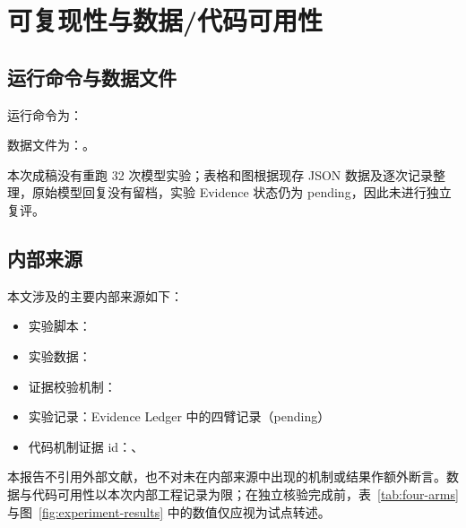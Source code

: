 \documentclass[UTF8]{ctexart}
\begin{document}
\section{可复现性与数据/代码可用性}

\subsection{运行命令与数据文件}

运行命令为：


数据文件为：。

本次成稿没有重跑 32 次模型实验；表格和图根据现存 JSON 数据及逐次记录整理，原始模型回复没有留档，实验 Evidence 状态仍为 pending，因此未进行独立复评。

\subsection{内部来源}

本文涉及的主要内部来源如下：

\begin{itemize}[leftmargin=1.6em]
  \item 实验脚本：
  \item 实验数据：
  \item 证据校验机制：
  \item 实验记录：Evidence Ledger 中的四臂记录（pending）
  \item 代码机制证据 id：、
\end{itemize}

本报告不引用外部文献，也不对未在内部来源中出现的机制或结果作额外断言。数据与代码可用性以本次内部工程记录为限；在独立核验完成前，表~\ref{tab:four-arms} 与图~\ref{fig:experiment-results} 中的数值仅应视为试点转述。
\end{document}
